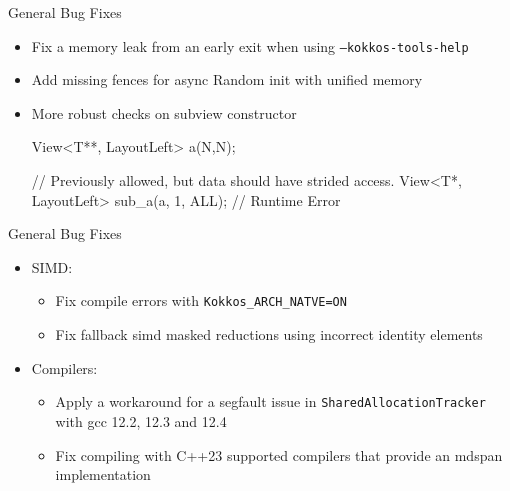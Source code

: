 \begin{frame}[fragile]{General Bug Fixes}
    \begin{itemize}
      \item Fix a memory leak from an early exit when using \texttt{--kokkos-tools-help} %
      \item Add missing fences for async Random init with unified memory %
      \item More robust checks on subview constructor %
        \begin{code}[keywords={std}]
View<T**, LayoutLeft> a(N,N);

// Previously allowed, but data should have strided access.
View<T*, LayoutLeft> sub_a(a, 1, ALL); // Runtime Error
        \end{code}

    \end{itemize}
\end{frame}


\begin{frame}[fragile]{General Bug Fixes}
  \begin{itemize}
    \item SIMD:
    \begin{itemize}
      \item Fix compile errors with \texttt{Kokkos\_ARCH\_NATVE=ON} %
      \item Fix fallback simd masked reductions using incorrect identity elements %
    \end{itemize}
    \item Compilers:
    \begin{itemize}
      \item Apply a workaround for a segfault issue in \texttt{SharedAllocationTracker} with gcc 12.2, 12.3 and 12.4 %
      \item Fix compiling with C++23 supported compilers that provide an mdspan implementation %
    \end{itemize}
  \end{itemize}
\end{frame}


